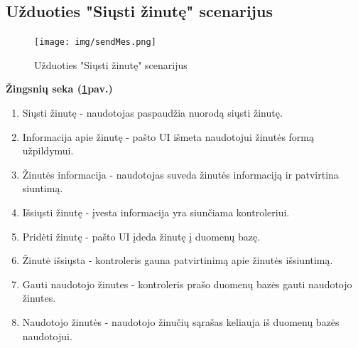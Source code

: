 \documentclass{VUMIFPSkursinis}
\begin{document}
\subsection{Užduoties "Siųsti žinutę" scenarijus}
\begin{figure}[H]
	\centering
	\texttt{[image: img/sendMes.png]}
	\caption{Užduoties "Siųsti žinutę" scenarijus}
	\label{fig:sendMess}
\end{figure}
\textbf{Žingsnių seka (\ref{fig:sendMess}pav.)}\\
\begin{enumerate}
	\item Siųsti žinutę - naudotojas paspaudžia nuorodą siųsti žinutę.
	\item Informacija apie žinutę - pašto UI išmeta naudotojui žinutės formą užpildymui.
	\item Žinutės informacija - naudotojas suveda žinutės informaciją ir patvirtina siuntimą.
	\item Išsiųsti žinutę - įvesta informacija yra siunčiama kontroleriui.
	\item Pridėti žinutę - pašto UI įdeda žinutę į duomenų bazę.
	\item Žinutė išsiųsta - kontroleris gauna patvirtinimą apie žinutės išsiuntimą.
	\item Gauti naudotojo žinutes - kontroleris prašo duomenų bazės gauti naudotojo žinutes.
	\item Naudotojo žinutės - naudotojo žinučių sąrašas keliauja iš duomenų bazės naudotojui.
\end{enumerate}
\end{document}
